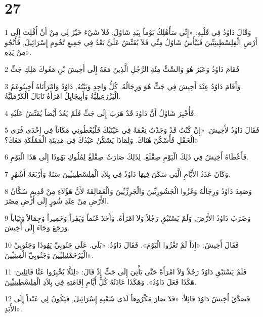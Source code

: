 \chapter{27}

\par 1 وَقَالَ دَاوُدُ فِي قَلْبِهِ: «إِنِّي سَأَهْلِكُ يَوْماً بِيَدِ شَاوُلَ, فَلاَ شَيْءَ خَيْرٌ لِي مِنْ أَنْ أُفْلِتَ إِلَى أَرْضِ الْفِلِسْطِينِيِّينَ فَيَيْأَسُ شَاوُلُ مِنِّي فَلاَ يُفَتِّشُ عَلَيَّ بَعْدُ فِي جَمِيعِ تُخُومِ إِسْرَائِيلَ, فَأَنْجُو مِنْ يَدِهِ».
\par 2 فَقَامَ دَاوُدُ وَعَبَرَ هُوَ وَالسِّتُّ مِئَةِ الرَّجُلِ الَّذِينَ مَعَهُ إِلَى أَخِيشَ بْنِ مَعُوكَ مَلِكِ جَتٍّ
\par 3 وَأَقَامَ دَاوُدُ عِنْدَ أَخِيشَ فِي جَتٍّ هُوَ وَرِجَالُهُ, كُلُّ وَاحِدٍ وَبَيْتُهُ, دَاوُدُ وَامْرَأَتَاهُ أَخِينُوعَمُ الْيَزْرَعِيلِيَّةُ وَأَبِيجَايِلُ امْرَأَةُ نَابَالَ الْكَرْمَلِيَّةُ.
\par 4 فَأُخْبِرَ شَاوُلُ أَنَّ دَاوُدَ قَدْ هَرَبَ إِلَى جَتٍّ فَلَمْ يَعُدْ أَيْضاً يُفَتِّشُ عَلَيْهِ.
\par 5 فَقَالَ دَاوُدُ لأَخِيشَ: «إِنْ كُنْتُ قَدْ وَجَدْتُ نِعْمَةً فِي عَيْنَيْكَ فَلْيُعْطُونِي مَكَاناً فِي إِحْدَى قُرَى الْحَقْلِ فَأَسْكُنَ هُنَاكَ. وَلِمَاذَا يَسْكُنُ عَبْدُكَ فِي مَدِينَةِ الْمَمْلَكَةِ مَعَكَ؟»
\par 6 فَأَعْطَاهُ أَخِيشُ فِي ذَلِكَ الْيَوْمِ صِقْلَغَ. لِذَلِكَ صَارَتْ صِقْلَغُ لِمُلُوكِ يَهُوذَا إِلَى هَذَا الْيَوْمِ.
\par 7 وَكَانَ عَدَدُ الأَيَّامِ الَّتِي سَكَنَ فِيهَا دَاوُدُ فِي بِلاَدِ الْفِلِسْطِينِيِّينَ سَنَةً وَأَرْبَعَةَ أَشْهُرٍ.
\par 8 وَصَعِدَ دَاوُدُ وَرِجَالُهُ وَغَزُوا الْجَشُورِيِّينَ وَالْجَرِزِّيِّينَ وَالْعَمَالِقَةَ لأَنَّ هَؤُلاَءِ مِنْ قَدِيمٍ سُكَّانُ الأَرْضِ مِنْ عِنْدِ شُورٍ إِلَى أَرْضِ مِصْرَ.
\par 9 وَضَرَبَ دَاوُدُ الأَرْضَ, وَلَمْ يَسْتَبْقِ رَجُلاً وَلاَ امْرَأَةً, وَأَخَذَ غَنَماً وَبَقَراً وَحَمِيراً وَجِمَالاً وَثِيَاباً وَرَجَعَ وَجَاءَ إِلَى أَخِيشَ.
\par 10 فَقَالَ أَخِيشُ: «إِذاً لَمْ تَغْزُوا الْيَوْمَ». فَقَالَ دَاوُدُ: «بَلَى. عَلَى جَنُوبِيِّ يَهُوذَا وَجَنُوبِيِّ الْيَرْحَمْئِيلِيِّينَ وَجَنُوبِيِّ الْقِينِيِّينَ».
\par 11 فَلَمْ يَسْتَبْقِ دَاوُدُ رَجُلاً وَلاَ امْرَأَةً حَتَّى يَأْتِيَ إِلَى جَتٍّ إِذْ قَالَ: «لِئَلَّا يُخْبِرُوا عَنَّا قَائِلِينَ: هَكَذَا فَعَلَ دَاوُدُ». وَهَكَذَا عَادَتُهُ كُلَّ أَيَّامِ إِقَامَتِهِ فِي بِلاَدِ الْفِلِسْطِينِيِّينَ.
\par 12 فَصَدَّقَ أَخِيشُ دَاوُدَ قَائِلاً: «قَدْ صَارَ مَكْرُوهاً لَدَى شَعْبِهِ إِسْرَائِيلَ, فَيَكُونُ لِي عَبْداً إِلَى الأَبَدِ».


